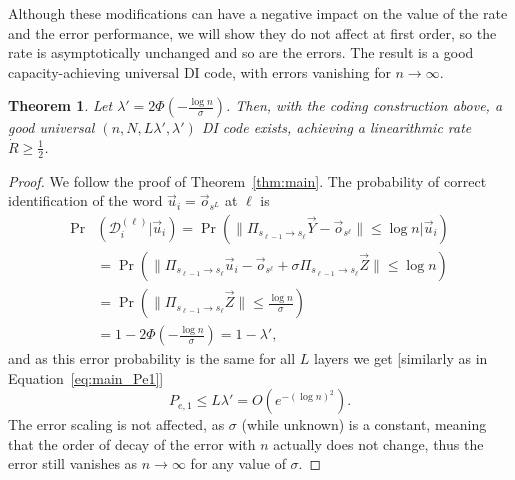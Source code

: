 \documentclass[10pt,conference]{IEEEtran}
\newtheorem{theorem}{Theorem}
\newcommand{\1}{\mathds{1}}
\newcommand{\cD}{\mathcal{D}}
\begin{document}
Although these modifications can have a negative impact on the value of the rate and the error performance, we will show they do not affect at first order, so the rate is asymptotically unchanged and so are the errors. The result is a good capacity-achieving universal DI code, with errors vanishing for $n\to\infty$.

\begin{theorem}\label{thm:uni_code}
Let $\lambda'=2\Phi(-\frac{\log n}{\sigma})$. Then, with the coding construction above, a good universal $(n, N,L\lambda',\lambda')$ DI code exists, achieving a linearithmic rate $\dot R\geq\frac12$.
\end{theorem}

\begin{proof}
We follow the proof of Theorem~\ref{thm:main}. The probability of correct identification of the word $\vec{u}_i=\vec{o}_{s^{L}}$ at $\ell$ is
\begin{equation}\label{eq:uni_layer_error1}
\begin{split}
\Pr&(\cD_i^{(\ell)}|\vec{u}_i)=\Pr\left(\|\Pi_{s_{\ell-1}\to s_{\ell}}\vec{Y}-\vec{o}_{s^\ell}\|\leq\log n|\vec{u}_i\right)\\
&=\Pr\left(\|\Pi_{s_{\ell-1}\to s_{\ell}}\vec{u}_i-\vec{o}_{s^\ell}+\sigma \Pi_{s_{\ell-1}\to s_{\ell}}\vec{Z}\|\leq \log n\right)\\
&=\Pr\left(\|\Pi_{s_{\ell-1}\to s_{\ell}}\vec{Z}\|\leq\frac{\log n}{\sigma}\right)\\
&=1-2\Phi\left(-\frac{\log n}{\sigma}\right)=1-\lambda',
\end{split}
\end{equation}
and as this error probability is the same for all $L$ layers we get [similarly as in Equation~\eqref{eq:main_Pe1}] 
\begin{equation}\label{eq:uni_Pe1}
P_{e,1}\leq L\lambda'=O(e^{-(\log n)^2}).
\end{equation}
The error scaling is not affected, as $\sigma$ (while unknown) is a constant, meaning that the order of decay of the error with $n$ actually does not change,
thus the error still vanishes as $n\to\infty$ for any value of $\sigma$. 


\end{proof}
\end{document}
